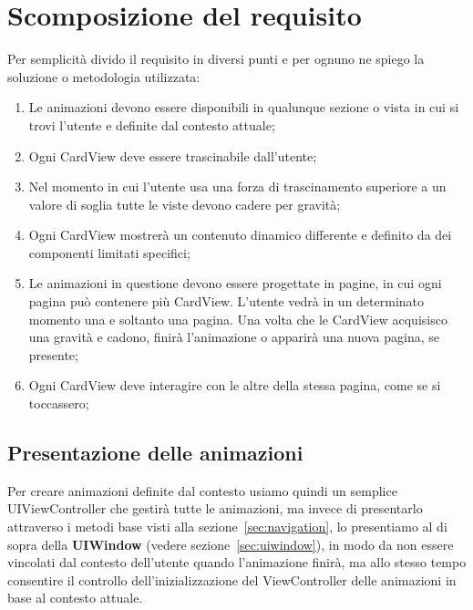 \section{Scomposizione del requisito}

Per semplicità divido il requisito in diversi punti e per ognuno ne spiego la soluzione
o metodologia utilizzata:

\begin{enumerate}
    \item\label{animationenum:1} Le animazioni devono essere disponibili in qualunque sezione o vista in cui si trovi l'utente e definite dal contesto attuale;

    \item\label{animationenum:2} Ogni CardView deve essere trascinabile dall'utente;
    
    \item\label{animationenum:3} Nel momento in cui l'utente usa una forza di trascinamento superiore a un valore di soglia tutte le viste devono
        cadere per gravità;

    \item\label{animationenum:4} Ogni CardView mostrerà un contenuto dinamico differente e definito da dei componenti
    limitati specifici;

    \item\label{animationenum:5} Le animazioni in questione devono essere progettate in pagine, in cui ogni pagina può contenere 
    più CardView. L'utente vedrà in un determinato momento una e soltanto una pagina. 
    Una volta che le CardView acquisisco una gravità e cadono, finirà l'animazione o apparirà
    una nuova pagina, se presente;

    \item\label{animationenum:7} Ogni CardView deve interagire con le altre della stessa pagina, come se si toccassero;

\end{enumerate}

\subsection{Presentazione delle animazioni}

Per creare animazioni definite dal contesto usiamo quindi un semplice UIViewController che gestirà tutte le animazioni,
ma invece di presentarlo attraverso i metodi base visti alla sezione~\ref{sec:navigation}, lo presentiamo al di sopra della \textbf{UIWindow} (vedere sezione~\ref{sec:uiwindow}),
in modo da non essere vincolati dal contesto dell'utente quando l'animazione finirà, ma allo stesso tempo
consentire il controllo dell'inizializzazione del ViewController delle animazioni in base al contesto attuale.

